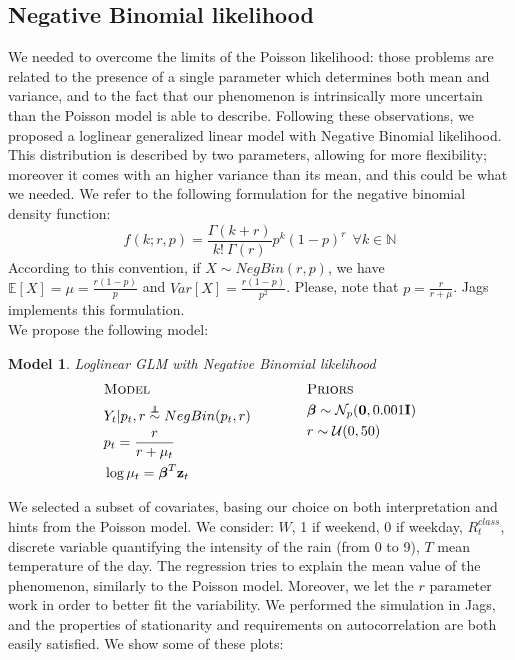 \documentclass[11pt,twoside]{report}
\newcommand\independent{\protect\mathpalette{\protect\independenT}{\perp}}
\def\independenT#1#2{\mathrel{\rlap{$#1#2$}\mkern2mu{#1#2}}}
\newtheorem{model}{Model}
\begin{document}
\subsection{Negative Binomial likelihood}
We needed to overcome the limits of the Poisson likelihood: those problems are related to the presence of a single parameter which determines both mean and variance, and to the fact that our phenomenon is intrinsically more uncertain than the Poisson model is able to describe. Following these observations, we proposed a loglinear generalized linear model with Negative Binomial likelihood. This distribution is described by two parameters, allowing for more flexibility; moreover it comes with an higher variance than its mean, and this could be what we needed.
We refer to the following formulation for the negative binomial density function:
\begin{equation}
f(k;r,p) = \frac{\Gamma(k+r)}{k!\ \Gamma(r)} p^k (1-p)^r \ \ \forall k\in\mathbb{N}
\end{equation}
According to this convention, if $X \sim NegBin(r,p)$, we have $\mathbb{E}[X] = \mu = \frac{r(1-p)}{p}$ and $Var[X] = \frac{r(1-p)}{p^2}$. Please, note that $p = \frac{r}{r+\mu}$. Jags implements this formulation.\\
We propose the following model: 
\begin{model} Loglinear GLM with Negative Binomial likelihood\\
	\begin{equation*}
	\begin{aligned}
	&\textsc{Model}\\
	&Y_t  |  p_t,r \overset{\independent}{\sim} NegBin(p_t,r)\\
	&p_t = \frac{r}{r+\mu_t}\\
	&\log{\mu_t} = \boldsymbol{\beta}^T\mathbf{z}_t\\
	\end{aligned}
	\qquad \qquad
	\begin{aligned}[c]
	&\textsc{Priors}\\
	&\boldsymbol{\beta} \sim \mathcal{N}_p(\mathbf{0}, 0.001\mathbf{I})\\
	&r \sim \mathcal{U}(0,50)\\
	&\\
	&\\
	\end{aligned}
	\end{equation*}
\end{model}
We selected a subset of covariates, basing our choice on both interpretation and hints from the Poisson model. We consider: $W$, 1 if weekend, 0 if weekday, $R_{t}^{class}$, discrete variable quantifying the intensity of the rain (from 0 to 9), $T$ mean temperature of the day. The regression tries to explain the mean value of the phenomenon, similarly to the Poisson model. Moreover, we let the $r$ parameter work in order to better fit the variability. We performed the simulation in Jags, and the properties of stationarity and requirements on autocorrelation are both easily satisfied. We show some of these plots:
\end{document}
